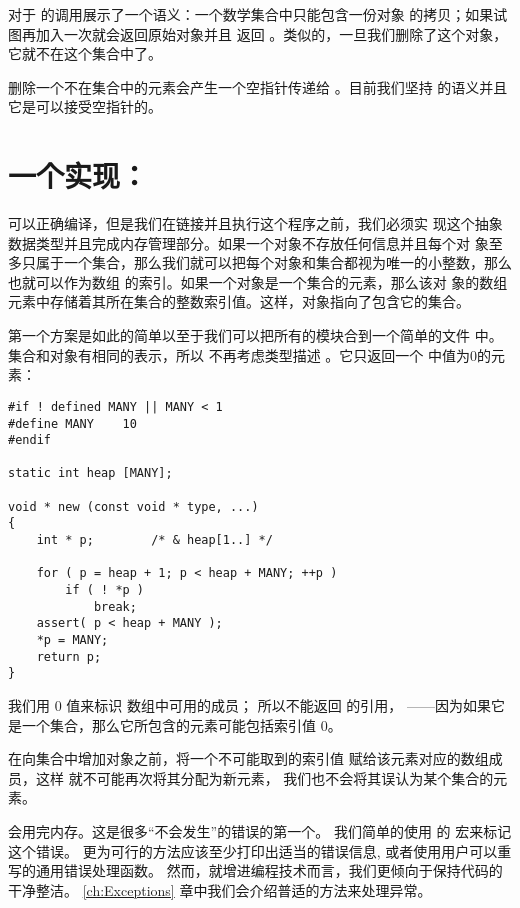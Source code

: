 对于  的调用展示了一个语义：一个数学集合中只能包含一份对象
 的拷贝；如果试图再加入一次就会返回原始对象并且  返回
。类似的，一旦我们删除了这个对象，它就不在这个集合中了。

删除一个不在集合中的元素会产生一个空指针传递给 。目前我们坚持
 的语义并且它是可以接受空指针的。

\section{一个实现：}
 可以正确编译，但是我们在链接并且执行这个程序之前，我们必须实
现这个抽象数据类型并且完成内存管理部分。如果一个对象不存放任何信息并且每个对
象至多只属于一个集合，那么我们就可以把每个对象和集合都视为唯一的小整数，那么
也就可以作为数组  的索引。如果一个对象是一个集合的元素，那么该对
象的数组元素中存储着其所在集合的整数索引值。这样，对象指向了包含它的集合。

第一个方案是如此的简单以至于我们可以把所有的模块合到一个简单的文件
 中。集合和对象有相同的表示，所以  不再考虑类型描述
。它只返回一个  中值为0的元素：
\begin{lstlisting}
#if ! defined MANY || MANY < 1
#define MANY	10
#endif

static int heap [MANY];

void * new (const void * type, ...)
{
	int * p;		/* & heap[1..] */

	for ( p = heap + 1; p < heap + MANY; ++p )
		if ( ! *p )
			break;
	assert( p < heap + MANY );
	*p = MANY;
	return p;
}
\end{lstlisting}
我们用 0 值来标识  数组中可用的成员；
所以不能返回  的引用，
——因为如果它是一个集合，那么它所包含的元素可能包括索引值 0。

在向集合中增加对象之前，将一个不可能取到的索引值
 赋给该元素对应的数组成员，这样
 就不可能再次将其分配为新元素，
我们也不会将其误认为某个集合的元素。

 会用完内存。这是很多“不会发生”的错误的第一个。
我们简单的使用  的  宏来标记这个错误。
更为可行的方法应该至少打印出适当的错误信息,
或者使用用户可以重写的通用错误处理函数。
然而，就增进编程技术而言，我们更倾向于保持代码的干净整洁。
\ref{ch:Exceptions} 章中我们会介绍普适的方法来处理异常。

